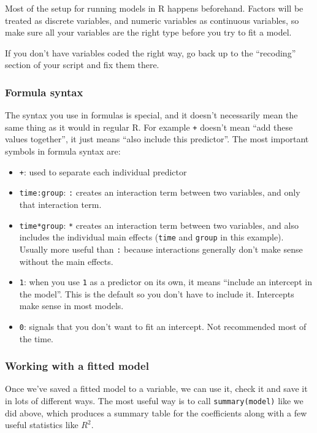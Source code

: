 \documentclass[
]{book}
\providecommand{\tightlist}{%
  \setlength{\itemsep}{0pt}\setlength{\parskip}{0pt}}
\begin{document}
Most of the setup for running models in R happens beforehand. Factors
will be treated as discrete variables, and numeric variables as
continuous variables, so make sure all your variables are the
right type before you try to fit a model.

If you don't have variables coded the right way, go back up
to the ``recoding'' section of your script and fix them there.

\hypertarget{formula-syntax}{%
\subsubsection{Formula syntax}\label{formula-syntax}}

The syntax you use in formulas is special, and it doesn't
necessarily mean the same thing as it would in regular R. For example
\texttt{+} doesn't mean ``add these values together'', it just means ``also
include this predictor''. The most important symbols in formula syntax
are:

\begin{itemize}
\tightlist
\item
  \texttt{+}: used to separate each individual predictor
\item
  \texttt{time:group}: \texttt{:} creates an interaction term between two variables,
  and only that interaction term.
\item
  \texttt{time*group}: \texttt{*} creates an interaction term between two variables,
  and also includes the individual main effects (\texttt{time} and \texttt{group} in
  this example). Usually more useful than \texttt{:} because interactions
  generally don't make sense without the main effects.
\item
  \texttt{1}: when you use \texttt{1} as a predictor on its own, it means ``include
  an intercept in the model''. This is the default so you don't
  have to include it. Intercepts make sense in most models.
\item
  \texttt{0}: signals that you don't want to fit an intercept. Not recommended
  most of the time.
\end{itemize}

\hypertarget{working-with-a-fitted-model}{%
\subsubsection{Working with a fitted model}\label{working-with-a-fitted-model}}

Once we've saved a fitted model to a variable, we can use it,
check it and save it in lots of different ways. The most
useful way is to call \texttt{summary(model)} like we did above,
which produces a summary table for the coefficients along
with a few useful statistics like \(R^2\).
\end{document}
